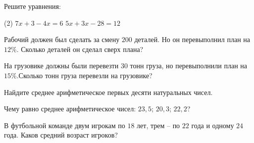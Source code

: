 \begin{homework}[number=1]
	\begin{listofex}
		\item Решите уравнения:
		\begin{tasks}(2)
			\task \( 7x +3 - 4x = 6 \)
			\task \( 5x +3x - 28 = 12 \)
		\end{tasks}
		\item Рабочий должен был сделать за смену \( 200 \) деталей. Но он перевыполнил план на \( 12\% \). Сколько деталей он сделал сверх плана?
		\item На грузовике должны были перевезти \( 30 \) тонн груза, но перевыполнили план на \( 15\% \).Сколько тонн груза перевезли на грузовике?
		\item Найдите среднее арифметическое первых десяти натуральных чисел.
		\item Чему равно среднее арифметическое чисел: \( 23,5 \); \( 20,3 \); \( 22,2 \)?
		\item В футбольной команде двум игрокам по \( 18 \) лет, трем – по \( 22 \) года и одному \( 24 \) года. Каков средний возраст игроков?
	\end{listofex}
\end{homework}

